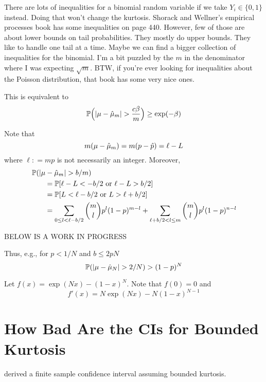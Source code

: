 \documentclass{amsart}
\newcommand{\art}[1]{{\color{blue}#1}}
\begin{document}
\art{There are lots of inequalities for a binomial random variable if we take $Y_i\in\{0,1\}$ instead. Doing that won't change the kurtosis. Shorack and Wellner's empirical processes book has some inequalities on page 440. However, few of those are about lower bounds on tail probabilities. They mostly do upper bounds. They like to handle one tail at a time.  Maybe we can find a bigger collection of inequalities for the binomial.  I'm a bit puzzled by the $m$ in the denominator where I was expecting $\sqrt{m}$. BTW, if you're ever looking for inequalities about the Poisson distribution, that book has some very nice ones. }

This is equivalent to
\[
\operatorname{\mathbb{P}}\Bigl(\lvert \mu - \hat{\mu}_m \rvert > \frac{c \beta}{m} \Bigr) \ge \exp(-\beta)
\]

Note that 
\[
m(\mu - \hat{\mu}_m)  = m(p - \hat{p}) = \ell - L
\]
where $\ell : = mp$ is not necessarily an integer.
Moreover, 
\begin{align*}
    \MoveEqLeft \Prob(\lvert \mu - \hmu_m \rvert > b/m) \\
    &= \Prob[ \ell - L < -b/2 \text{ or } \ell - L >  b/2] \\
    &= \Prob[ L < \ell - b/2 \text{ or } L > \ell + b/2] \\
    & = \sum_{0 \le l  < \ell - b/2}  \binom{m}{l} p^{l}(1-p)^{m-l} 
    + \sum_{\ell + b/2 < l \le m}  \binom{m}{l} p^l(1-p)^{n-l}
\end{align*}

\bigskip

BELOW IS A WORK IN PROGRESS


Thus, e.g., for $p < 1/N$ and $b \le 2pN $
\[
\operatorname{\mathbb{P}}(\lvert \mu - \hat{\mu}_N \rvert > 2/N) 
> (1-p)^{N} 
\]

Let $f(x) = \exp(Nx) - (1-x)^N$.  Note that $f(0) =0$ and 
\[
f'(x) = N \exp(Nx) - N(1-x)^{N-1}
\]

\section{How Bad Are the CIs for Bounded Kurtosis}

\cite{HicEtal14a} derived a finite sample confidence interval assuming bounded kurtosis.






\end{document}
